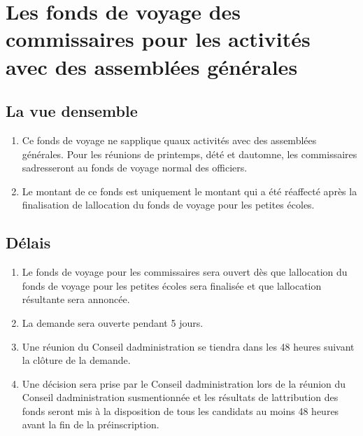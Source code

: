 \section{Les fonds de voyage des commissaires pour les activités avec des assemblées générales}
\label{les-fonds-de-voyage-des-commissaires-pour-les-activites-avec-des-assemblees-generales}

\subsection{La vue d\textquotesingle ensemble}
\label{la-vue-densemble-5}

\begin{enumerate}
 \item
  Ce fonds de voyage ne s\textquotesingle applique qu\textquotesingle aux activités avec des assemblées générales. Pour les réunions de printemps, d\textquotesingle été et d\textquotesingle automne, les commissaires s\textquotesingle adresseront au fonds de voyage normal des officiers.
 \item
  Le montant de ce fonds est uniquement le montant qui a été réaffecté après la finalisation de l\textquotesingle allocation du fonds de voyage pour les petites écoles.
\end{enumerate}

\subsection{Délais}
\label{delais}

\begin{enumerate}
 \item
  Le fonds de voyage pour les commissaires sera ouvert dès que l\textquotesingle allocation du fonds de voyage pour les petites écoles sera finalisée et que l\textquotesingle allocation résultante sera annoncée.
 \item
  La demande sera ouverte pendant 5 jours.
 \item
  Une réunion du Conseil d\textquotesingle administration se tiendra dans les 48 heures suivant la clôture de la demande.
 \item
  Une décision sera prise par le Conseil d\textquotesingle administration lors de la réunion du Conseil d\textquotesingle administration susmentionnée et les résultats de l\textquotesingle attribution des fonds seront mis à la disposition de tous les candidats au moins 48 heures avant la fin de la préinscription.
\end{enumerate}

